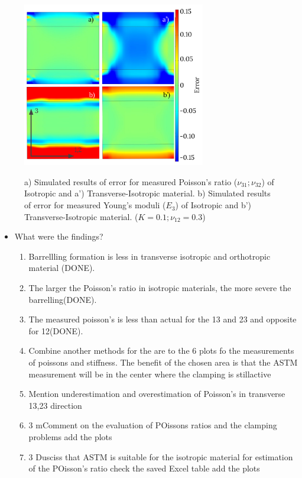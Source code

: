 \documentclass[review]{elsarticle}
\begin{document}
\begin{figure}[h]
\centering
\includegraphics[width=8cm]{BarellingError.pdf}
\label{fig:Error}
\caption{\label{fig:Error} a) Simulated results of error for measured
Poisson's ratio ($\nu_{31};\nu_{32}$) of Isotropic and a')
Transverse-Isotropic material.
b) Simulated results of error for measured Young's moduli ($E_3$)
of Isotropic and b') Transverse-Isotropic material. ($K=0.1; \nu_{12}=0.3$)}
\end{figure}





\begin{itemize}
\color{red}
\item What were the findings?

	\begin{enumerate}
	\color{black}
		\item Barrellling formation is less in transverse isotropic and orthotropic
		material (DONE).
		\item The larger the Poisson's ratio in isotropic materials, the more severe
		the barrelling(DONE).
		\item The measured poisson's is less than actual for the 13 and 23 and
		opposite for 12(DONE).
		\item Combine another methods for the are to the 6 plots fo the measurements
		of poissons and stiffness. {\color{red} The benefit of the chosen area is
		that the ASTM measurement will be in the center where the clamping is
		stillactive}
	    \item Mention underestimation and overestimation of Poisson's in transverse
	    13,23 direction
	    \item 3 mComment on the evaluation of POissons ratios and the clamping
	    problems {\color{red} add the plots}
	    \item 3 Dusciss that ASTM is suitable for the isotropic material for
	    estimation of the POisson's ratio check the saved Excel table {\color{red}
	    add the plots}
	    
		
		
		
		
	\end{enumerate}
\end{itemize}
\end{document}

